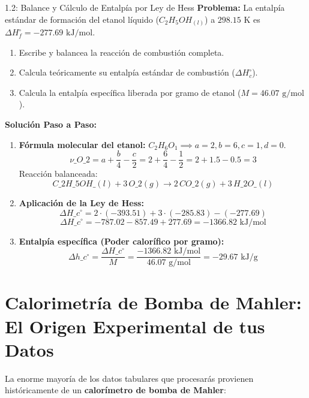 \documentclass[11pt,letterpaper]{report}
\begin{document}
\begin{exercisebox}{1.2: Balance y Cálculo de Entalpía por Ley de Hess}
\textbf{Problema:} La entalpía estándar de formación del etanol líquido ($C_2H_5OH_{(l)}$) a $298.15\text{ K}$ es $\Delta H_f^\circ = -277.69\text{ kJ/mol}$.
\begin{enumerate}
    \item Escribe y balancea la reacción de combustión completa.
    \item Calcula teóricamente su entalpía estándar de combustión ($\Delta H_c^\circ$).
    \item Calcula la entalpía específica liberada por gramo de etanol ($M = 46.07\text{ g/mol}$).
\end{enumerate}

\vspace{0.2cm}\noindent\textbf{Solución Paso a Paso:}
\begin{enumerate}
    \item \textbf{Fórmula molecular del etanol:} $C_2 H_6 O_1 \implies a=2, b=6, c=1, d=0$.
    $$\nu\_{O\_2} = a + \frac{b}{4} - \frac{c}{2} = 2 + \frac{6}{4} - \frac{1}{2} = 2 + 1.5 - 0.5 = 3$$
    Reacción balanceada:
    $$C\_2H\_5OH\_{(l)} + 3\,O\_{2(g)} \longrightarrow 2\,CO\_{2(g)} + 3\,H\_2O\_{(l)}$$
    \item \textbf{Aplicación de la Ley de Hess:}
    $$\Delta H\_c^\circ = 2\cdot(-393.51) + 3\cdot(-285.83) - (-277.69)$$
    $$\Delta H\_c^\circ = -787.02 - 857.49 + 277.69 = -1366.82\text{ kJ/mol}$$
    \item \textbf{Entalpía específica (Poder calorífico por gramo):}
    $$\Delta h\_c^\circ = \frac{\Delta H\_c^\circ}{M} = \frac{-1366.82\text{ kJ/mol}}{46.07\text{ g/mol}} = -29.67\text{ kJ/g}$$
\end{enumerate}
\end{exercisebox}

\section{Calorimetría de Bomba de Mahler: El Origen Experimental de tus Datos}

La enorme mayoría de los datos tabulares que procesarás provienen históricamente de un \textbf{calorímetro de bomba de Mahler}:
\end{document}
